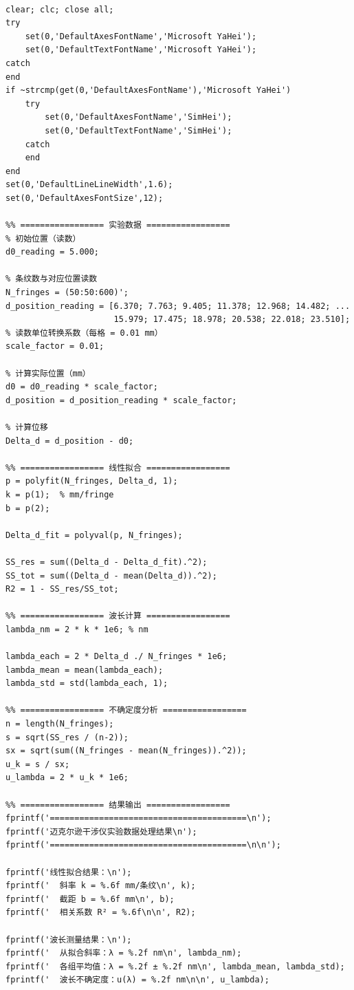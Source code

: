 ﻿\documentclass[12pt,a4paper]{article}
\begin{document}
\begin{lstlisting}[style=Matlab-boxed,caption={迈克尔逊干涉仪数据处理代码}]
%% 迈克尔逊干涉仪实验 —— 数据处理与可视化

clear; clc; close all;
try
    set(0,'DefaultAxesFontName','Microsoft YaHei');
    set(0,'DefaultTextFontName','Microsoft YaHei');
catch
end
if ~strcmp(get(0,'DefaultAxesFontName'),'Microsoft YaHei')
    try
        set(0,'DefaultAxesFontName','SimHei');
        set(0,'DefaultTextFontName','SimHei');
    catch
    end
end
set(0,'DefaultLineLineWidth',1.6);
set(0,'DefaultAxesFontSize',12);

%% ================= 实验数据 =================
% 初始位置（读数）
d0_reading = 5.000;

% 条纹数与对应位置读数
N_fringes = (50:50:600)';
d_position_reading = [6.370; 7.763; 9.405; 11.378; 12.968; 14.482; ...
                      15.979; 17.475; 18.978; 20.538; 22.018; 23.510];
% 读数单位转换系数（每格 = 0.01 mm）
scale_factor = 0.01;

% 计算实际位置（mm）
d0 = d0_reading * scale_factor;
d_position = d_position_reading * scale_factor;

% 计算位移
Delta_d = d_position - d0;

%% ================= 线性拟合 =================
p = polyfit(N_fringes, Delta_d, 1);
k = p(1);  % mm/fringe
b = p(2);

Delta_d_fit = polyval(p, N_fringes);

SS_res = sum((Delta_d - Delta_d_fit).^2);
SS_tot = sum((Delta_d - mean(Delta_d)).^2);
R2 = 1 - SS_res/SS_tot;

%% ================= 波长计算 =================
lambda_nm = 2 * k * 1e6; % nm

lambda_each = 2 * Delta_d ./ N_fringes * 1e6;
lambda_mean = mean(lambda_each);
lambda_std = std(lambda_each, 1);

%% ================= 不确定度分析 =================
n = length(N_fringes);
s = sqrt(SS_res / (n-2));
sx = sqrt(sum((N_fringes - mean(N_fringes)).^2));
u_k = s / sx;
u_lambda = 2 * u_k * 1e6;

%% ================= 结果输出 =================
fprintf('========================================\n');
fprintf('迈克尔逊干涉仪实验数据处理结果\n');
fprintf('========================================\n\n');

fprintf('线性拟合结果：\n');
fprintf('  斜率 k = %.6f mm/条纹\n', k);
fprintf('  截距 b = %.6f mm\n', b);
fprintf('  相关系数 R² = %.6f\n\n', R2);

fprintf('波长测量结果：\n');
fprintf('  从拟合斜率：λ = %.2f nm\n', lambda_nm);
fprintf('  各组平均值：λ = %.2f ± %.2f nm\n', lambda_mean, lambda_std);
fprintf('  波长不确定度：u(λ) = %.2f nm\n\n', u_lambda);


\end{lstlisting}
\end{document}
